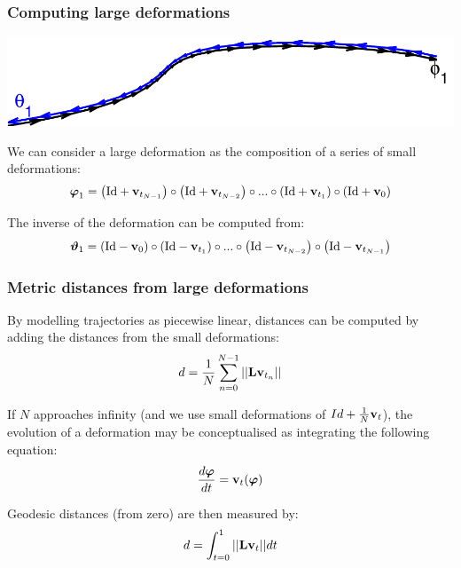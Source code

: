 \begin{frame}
\frametitle{Computing large deformations}
\includegraphics[width=\textwidth]{trajectory0}\par
We can consider a large deformation as the composition of a series of small deformations:
\begin{eqnarray*}
{\boldsymbol\varphi}_{1} = \left(\mathrm{Id} + {\bf v}_{t_{N-1}}\right) \circ  \left(\mathrm{Id} + {\bf v}_{t_{N-2}}\right) \circ ... \circ \left(\mathrm{Id} + {\bf v}_{t_1}\right) \circ \left(\mathrm{Id} + {\bf v}_0\right)
\end{eqnarray*}

The inverse of the deformation can be computed from:
\begin{eqnarray*}
{\boldsymbol\vartheta}_{1} = \left(\mathrm{Id} - {\bf v}_0\right) \circ  \left(\mathrm{Id} - {\bf v}_{t_1}\right) \circ ... \circ \left(\mathrm{Id} - {\bf v}_{t_{N-2}}\right) \circ \left(\mathrm{Id} - {\bf v}_{t_{N-1}}\right)
\end{eqnarray*}

\end{frame}


\begin{frame}
\frametitle{Metric distances from large deformations}
By modelling trajectories as piecewise linear, distances can be computed by adding the distances from the small deformations:
\begin{eqnarray*}
d = \frac{1}{N}\sum_{n=0}^{N-1} || {\bf L} {\bf v}_{t_n} ||
\end{eqnarray*}

If $N$ approaches infinity (and we use small deformations of $Id + \frac{1}{N}{\bf v}_t$), the evolution of a deformation may be conceptualised as integrating the following equation:
\begin{eqnarray*}
\frac{d {\boldsymbol\varphi}}{d t} = {\bf v}_t ({\boldsymbol\varphi})
\end{eqnarray*}

Geodesic distances (from zero) are then measured by:
\begin{eqnarray*}
d = \int_{t=0}^1  || {\bf L} {\bf v}_t || dt
\end{eqnarray*}
\end{frame}

